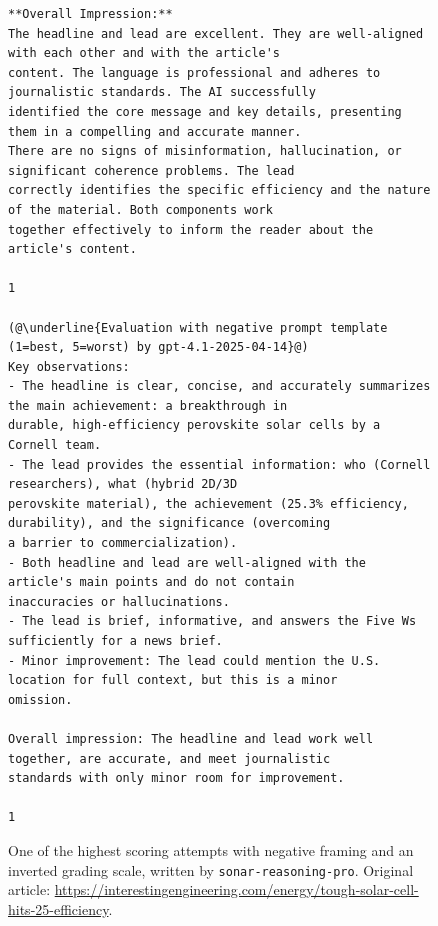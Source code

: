 \documentclass[UTF8,noindent,nohyp,parspace,titlepage,a4paper,12pt]{article}
\begin{document}
\begin{figure}[!hbtp]
\begin{lstlisting}[basicstyle=\fontsize{7pt}{8pt}\selectfont\sffamily,frame=single,linewidth=\textwidth]
**Overall Impression:**
The headline and lead are excellent. They are well-aligned with each other and with the article's
content. The language is professional and adheres to journalistic standards. The AI successfully
identified the core message and key details, presenting them in a compelling and accurate manner.
There are no signs of misinformation, hallucination, or significant coherence problems. The lead
correctly identifies the specific efficiency and the nature of the material. Both components work
together effectively to inform the reader about the article's content.

1

(@\underline{Evaluation with negative prompt template (1=best, 5=worst) by gpt-4.1-2025-04-14}@)
Key observations:
- The headline is clear, concise, and accurately summarizes the main achievement: a breakthrough in
durable, high-efficiency perovskite solar cells by a Cornell team.
- The lead provides the essential information: who (Cornell researchers), what (hybrid 2D/3D
perovskite material), the achievement (25.3% efficiency, durability), and the significance (overcoming
a barrier to commercialization).
- Both headline and lead are well-aligned with the article's main points and do not contain
inaccuracies or hallucinations.
- The lead is brief, informative, and answers the Five Ws sufficiently for a news brief.
- Minor improvement: The lead could mention the U.S. location for full context, but this is a minor
omission.

Overall impression: The headline and lead work well together, are accurate, and meet journalistic
standards with only minor room for improvement.

1
      \end{lstlisting}
      \caption{%
        One of the highest scoring attempts with negative framing and an
        inverted grading scale, written by
        \texttt{sonar-reasoning-pro}. Original article:
        {\footnotesize\url{https://interestingengineering.com/energy/tough-solar-cell-hits-25-efficiency}}.
      }
    \end{figure}
\end{document}
